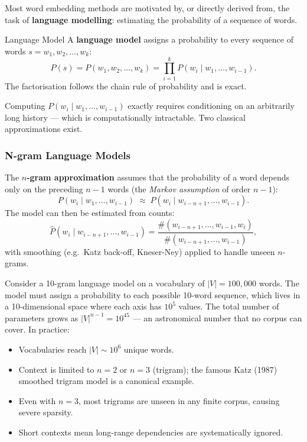 \documentclass[11pt,a4paper]{article}
\newcommand{\term}[1]{\textcolor{DefGreen}{\textbf{#1}}}
\begin{document}
Most word embedding methods are motivated by, or directly derived from, the task of \term{language modelling}: estimating the probability of a sequence of words.

\begin{defbox}{Language Model}
A \term{language model} assigns a probability to every sequence of words $s = w_1, w_2, \ldots, w_k$:
\[
  P(s) = P(w_1, w_2, \ldots, w_k) = \prod_{i=1}^{k} P(w_i \mid w_1, \ldots, w_{i-1}).
\]
The factorisation follows the chain rule of probability and is exact.
\end{defbox}

Computing $P(w_i \mid w_1, \ldots, w_{i-1})$ exactly requires conditioning on an arbitrarily long history — which is computationally intractable. Two classical approximations exist.

\subsubsection{N-gram Language Models}

The \term{$n$-gram approximation} assumes that the probability of a word depends only on the preceding $n-1$ words (the \emph{Markov assumption} of order $n-1$):
\[
  P(w_i \mid w_1, \ldots, w_{i-1}) \;\approx\; P(w_i \mid w_{i-n+1}, \ldots, w_{i-1}).
\]
The model can then be estimated from counts:
\[
  \hat{P}(w_i \mid w_{i-n+1}, \ldots, w_{i-1}) = \frac{\#(w_{i-n+1}, \ldots, w_{i-1}, w_i)}{\#(w_{i-n+1}, \ldots, w_{i-1})},
\]
with smoothing (e.g.\ Katz back-off, Kneser-Ney) applied to handle unseen $n$-grams.

\begin{warnbox}
Consider a 10-gram language model on a vocabulary of $|V| = 100{,}000$ words. The model must assign a probability to each possible 10-word sequence, which lives in a 10-dimensional space where each axis has $10^5$ values. The total number of parameters grows as $|V|^{n-1} = 10^{45}$ — an astronomical number that no corpus can cover. In practice:
\begin{itemize}
  \item Vocabularies reach $|V| \sim 10^6$ unique words.
  \item Context is limited to $n = 2$ or $n = 3$ (trigram); the famous Katz (1987) smoothed trigram model is a canonical example.
  \item Even with $n = 3$, most trigrams are unseen in any finite corpus, causing severe sparsity.
  \item Short contexts mean long-range dependencies are systematically ignored.
\end{itemize}
\end{warnbox}
\end{document}
